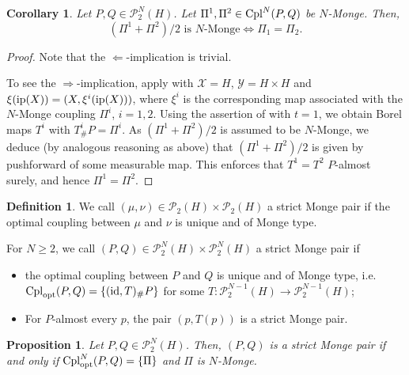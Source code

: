 \documentclass[a4paper]{amsart}
\numberwithin{theorem}{section}
\newtheorem{proposition}[theorem]{Proposition}
\newtheorem{corollary}[theorem]{Corollary}
\theoremstyle{definition}
\newtheorem{definition}[theorem]{Definition}
\newcommand{\id}{\textup{id}}
\newcommand{\cpl}{\textup{Cpl}}
\newcommand{\Pc}{\mathcal P}
\newcommand{\cplopt}{\cpl_{\rm opt}}
\renewcommand{\H}{H}
\newcommand{\ip}{\textup{ip}}
\begin{document}
\begin{corollary}
    \label{cor:N-Monge.uniqueness}
    Let $P,Q \in \Pc_2^N(\H)$. Let $\Pi^1,\Pi^2 \in \cpl^N(P,Q)$ be $N$-Monge. Then, 
    \[ (\Pi^1 + \Pi^2)/2 \text{ is $N$-Monge} \iff \Pi_1 = \Pi_2. \]
\end{corollary} 

\begin{proof}
    Note that the $\Longleftarrow$-implication is trivial.
    
    To see the $\Longrightarrow$-implication, apply  with $\mathcal X = H$, $\mathcal Y = H \times H$ and $\xi(\ip(X)) = (X,\xi^i(\ip(X)))$, where $\xi^i$ is the corresponding map associated with the $N$-Monge coupling $\Pi^i$, $i = 1,2$.
    Using the assertion of  with $t = 1$, we obtain Borel maps $T^i$ with $T^i_\# P = \Pi^i$.
    As $(\Pi^1 + \Pi^2)/2$ is assumed to be $N$-Monge, we deduce (by analogous reasoning as above) that $(\Pi^1 + \Pi^2)/2$ is given by pushforward of some measurable map.
    This enforces that $T^1 = T^2$ $P$-almost surely, and hence $\Pi^1 = \Pi^2$.
\end{proof}

\begin{definition} 
We call $(\mu,\nu) \in \Pc_2(\H) \times \Pc_2(\H)$ a strict Monge pair if the optimal coupling between $\mu$ and $\nu$ is unique and of Monge type.

For $N \ge 2$, we call
$(P,Q)  \in \Pc_2^N(\H) \times \Pc_2^N(\H) $ a strict Monge pair if
\begin{itemize}
    \item the optimal coupling between $P$ and $Q$ is unique and of Monge type, i.e.\ $\cplopt(P,Q) = \{ (\id,T)_\# P \}$ for some $T : \Pc^{N-1}_2(\H) \to \Pc^{N-1}_2(\H)$;
    \item For $P$-almost every $p$, the pair $(p,T(p))$ is a strict Monge pair.
\end{itemize}
\end{definition}


\begin{proposition} \label{prop:N-Monge.strict-Monge}
Let $P,Q \in \Pc_2^N(\H)$. Then, $(P,Q)$ is a strict Monge pair if and only if $\cplopt^N(P,Q)= \{\Pi\}$ and $\Pi$ is $N$-Monge.  
\end{proposition}
\end{document}
